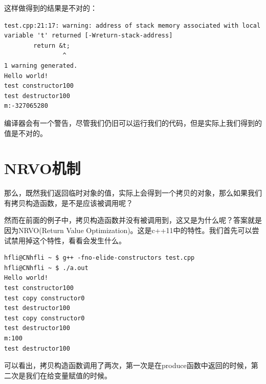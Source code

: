 \documentclass[12pt]{article}
\begin{document}
这样做得到的结果是不对的：

\begin{verbatim}
test.cpp:21:17: warning: address of stack memory associated with local variable 't' returned [-Wreturn-stack-address]
        return &t;
                ^
1 warning generated.
Hello world!
test constructor100
test destructor100
m:-327065280
\end{verbatim}

编译器会有一个警告，尽管我们仍旧可以运行我们的代码，但是实际上我们得到的值是不对的。

\section{NRVO机制}\label{nrvoux673aux5236}

那么，既然我们返回临时对象的值，实际上会得到一个拷贝的对象，那么如果我们有拷贝构造函数，是不是应该被调用呢？

然而在前面的例子中，拷贝构造函数并没有被调用到，这又是为什么呢？答案就是因为NRVO(Return Value Optimization)。这是c++11中的特性。我们首先可以尝试禁用掉这个特性，看看会发生什么。

\begin{verbatim}
hfli@CNhfli ~ $ g++ -fno-elide-constructors test.cpp
hfli@CNhfli ~ $ ./a.out
Hello world!
test constructor100
test copy constructor0
test destructor100
test copy constructor0
test destructor100
m:100
test destructor100
\end{verbatim}

可以看出，拷贝构造函数调用了两次，第一次是在produce函数中返回的时候，第二次是我们在给变量赋值的时候。
\end{document}
